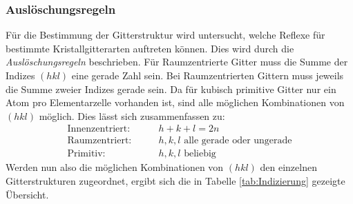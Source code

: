 \documentclass[a4paper,twoside,final]{article}
\begin{document}
\subsubsection{Auslöschungsregeln}
Für die Bestimmung der Gitterstruktur wird untersucht, welche Reflexe für bestimmte Kristallgitterarten auftreten können. Dies wird durch die \textit{Auslöschungsregeln} beschrieben. Für Raumzentrierte Gitter muss die Summe der Indizes $(hkl)$ eine gerade Zahl sein. Bei Raumzentrierten Gittern muss jeweils die Summe zweier Indizes gerade sein. Da für kubisch primitive Gitter nur ein Atom pro Elementarzelle vorhanden ist, sind alle möglichen Kombinationen von $(hkl)$ möglich. Dies lässt sich zusammenfassen zu:
\begin{align}
  \text{Innenzentriert:} & \qquad h + k +l = 2n\nonumber\\
  \text{Raumzentriert:}  & \qquad h, k, l \text{ alle gerade oder ungerade}\\
  \text{Primitiv:} & \qquad h, k, l \text{ beliebig}\nonumber
\end{align}
Werden nun also die möglichen Kombinationen von $(hkl)$ den einzelnen Gitterstrukturen zugeordnet, ergibt sich die in Tabelle \ref{tab:Indizierung} gezeigte Übersicht.
\end{document}

